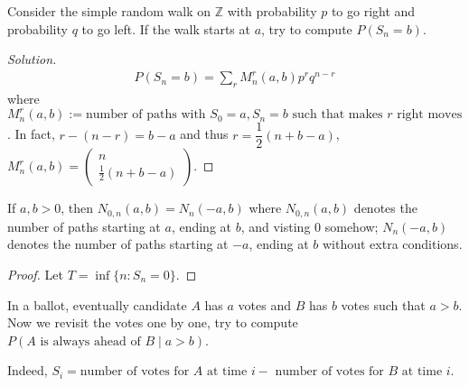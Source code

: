 \documentclass[11pt,singlecolumn, openany, citestyle=authoryear]{elegantbook}
\begin{document}
\begin{CJK}{UTF8}{gbsn}
\begin{example}
Consider the simple random walk on $\mathbb{Z}$ with probability $p$ to go right 
and probability $q$ to go left. If the walk starts at $a$, try to compute $P(S_n=b)$.
\end{example}
\begin{proof}[Solution]
    \begin{align*}
        P(S_n=b)=\sum_{r} M_n^r(a,b) p^r q^{n-r}
    \end{align*}
    where $M_n^r(a,b):= \text{number of paths with }
    S_0=a, S_n = b \text{ such that makes } r \text{ right moves}$.
    In fact, $r-(n-r)=b-a$ and thus $r= \dfrac{1}{2}(n+b-a)$, 
    $
    M_n^r(a,b) =\left(\begin{array}{c}
        n\\
        \frac{1}{2}(n+b-a)
        \end{array}\right).
    $
\end{proof}

\begin{proposition}
    If $a,b>0$, then $N_{0,n}(a,b)=N_n(-a,b)$
    where $N_{0,n}(a,b)$ denotes the number of paths starting at $a$, ending at $b$, and visting $0$ somehow;
    $N_n(-a,b)$ denotes the number of paths starting at $-a$, ending at $b$ without extra conditions.
\end{proposition}
\begin{proof}
    Let $T=\inf\{n:S_n=0\}$.
\end{proof}


    In a ballot, eventually candidate $A$ has $a$ votes and $B$ has $b$ votes such that 
    $a>b$. Now we revisit the votes one by one, try to compute 
    $P(A \text{ is always ahead of }B \mid a>b)$.

    Indeed, $S_i = \text{number of votes for }A \text{ at time } i-
    \text{ number of votes for }B \text{ at time }i$.


\end{CJK}
\end{document}
